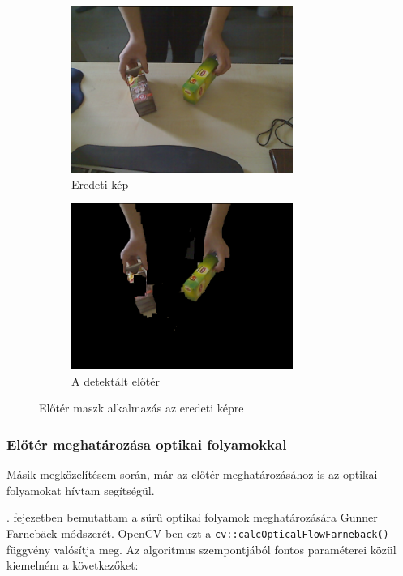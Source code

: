 \begin{figure}[tbh]
\centering
\begin{subfigure}[b]{.49\linewidth}
	\centering
	\includegraphics[width=205pt]{figures/image343.png}
	\caption{Eredeti kép}
  \end{subfigure}
\begin{subfigure}[b]{.49\linewidth}
	\centering
	\includegraphics[width=205pt]{figures/mask343_applied.png}
	\caption{A detektált előtér}
  \end{subfigure}
\caption{Előtér maszk alkalmazás az eredeti képre \label{fig:mask_applied}}
\end{figure}

    \subsubsection{Előtér meghatározása optikai folyamokkal \label{sec:of-mask}}
    
Másik megközelítésem során, már az előtér meghatározásához is az optikai folyamokat hívtam segítségül. 

. fejezetben bemutattam a sűrű optikai folyamok meghatározására Gunner Farnebäck módszerét. OpenCV-ben ezt a \texttt{cv::calcOpticalFlowFarneback()} \cite{opencv-mog} függvény valósítja meg. Az algoritmus szempontjából fontos paraméterei közül kiemelném a következőket:

